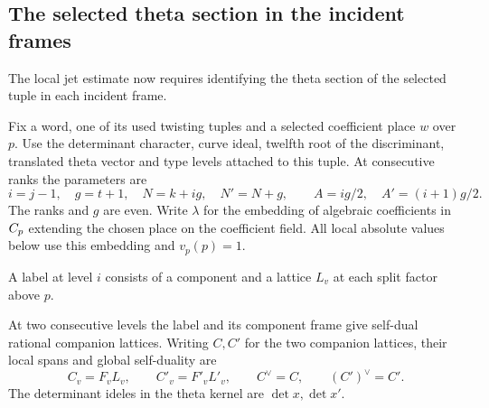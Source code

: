 \subsection{The selected theta section in the incident frames}
\label{subsec:incident-sections}

The local jet estimate now requires identifying the theta section of the selected tuple in each incident frame.

Fix a word, one of its used twisting tuples and a selected coefficient
place \(w\) over \(p\). Use the determinant character, curve ideal,
twelfth root of the discriminant, translated theta vector and type
levels attached to this tuple. At consecutive ranks the parameters are
\[
 i=j-1,\quad g=t+1,\quad N=k+ig,\quad N'=N+g,
 \qquad A=ig/2,\quad A'=(i+1)g/2 .
\]
The ranks and \(g\) are even. Write \(\lambda\) for the embedding
of algebraic coefficients in \(C_p\) extending the chosen place
on the coefficient field. All local absolute values below use this
embedding and \(v_p(p)=1\).

A label at level \(i\) consists of a component and a lattice \(L_v\)
at each split factor above \(p\).

\begin{proposition}\label{prop:incident-companion-lattices}
At two consecutive levels the label and its component frame give
self-dual rational companion lattices. Writing \(C,C'\) for the two companion lattices, their local spans and global self-duality are
\[
 C_v=F_vL_v,\qquad C'_v=F'_vL'_v,\qquad C^\vee=C,\qquad(C')^\vee=C'.
\]
The determinant ideles in the theta kernel are \(\det x,\det x'\).
\end{proposition}

